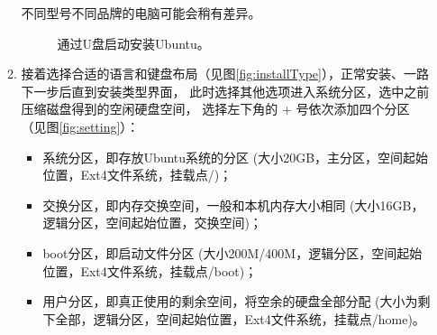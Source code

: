 \begin{itemize}
\begin{enumerate}
				不同型号不同品牌的电脑可能会稍有差异。
				\begin{figure}[htbp]
					\centering
					\hfill
                                        \caption{通过U盘启动安装Ubuntu。}
					\label{fig:UbuntuInstall}
				\end{figure}
			\item 接着选择合适的语言和键盘布局（见图\ref{fig:installType}），正常安装、一路下一步后直到安装类型界面，
				此时选择其他选项进入系统分区，选中之前压缩磁盘得到的空闲硬盘空间，
				选择左下角的 + 号依次添加四个分区（见图\ref{fig:setting}）：
				\begin{itemize}
					\item 系统分区，即存放Ubuntu系统的分区
					(大小20GB，主分区，空间起始位置，Ext4文件系统，挂载点/)；
					\item 交换分区，即内存交换空间，一般和本机内存大小相同
					(大小16GB，逻辑分区，空间起始位置，交换空间)；
					\item boot分区，即启动文件分区
					(大小200M/400M，逻辑分区，空间起始位置，Ext4文件系统，挂载点/boot)；
					\item 用户分区，即真正使用的剩余空间，将空余的硬盘全部分配
					(大小为剩下全部，逻辑分区，空间起始位置，Ext4文件系统，挂载点/home)。
				\end{itemize}
				\begin{figure}[htbp]
					\centering
\end{figure}
\end{enumerate}
\end{itemize}
